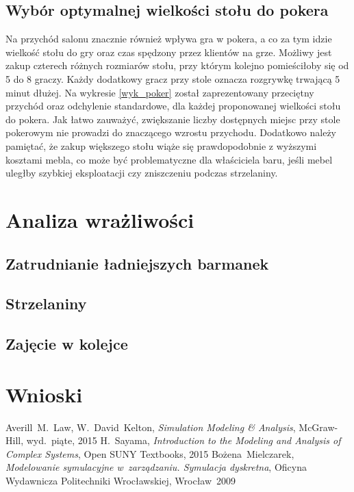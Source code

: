 \documentclass[12pt, a4paper, oneside]{mwart} %
\begin{document}
\subsection{Wybór optymalnej wielkości stołu do pokera}
Na przychód salonu znacznie również wpływa gra w pokera, a co za tym idzie wielkość stołu do gry oraz czas spędzony przez klientów na grze. Możliwy jest zakup czterech różnych rozmiarów stołu, przy którym kolejno pomieściłoby się od 5 do 8 graczy. Każdy dodatkowy gracz przy stole oznacza rozgrywkę trwającą 5 minut dłużej. Na wykresie \ref{wyk_poker} został zaprezentowany przeciętny przychód oraz odchylenie standardowe, dla każdej proponowanej wielkości stołu do pokera. Jak łatwo zauważyć, zwiększanie liczby dostępnych miejsc przy stole pokerowym nie prowadzi do znaczącego wzrostu przychodu. Dodatkowo należy pamiętać, że zakup większego stołu wiąże się prawdopodobnie z wyższymi kosztami mebla, co może być problematyczne dla właściciela baru, jeśli mebel uległby szybkiej eksploatacji czy zniszczeniu podczas strzelaniny.


\section{Analiza wrażliwości}

\subsection{Zatrudnianie ładniejszych barmanek}

\subsection{Strzelaniny}

\subsection{Zajęcie w kolejce}


\section{Wnioski}

\begin{thebibliography}{9}
Averill~M.~Law, W.~David~Kelton,
\emph{Simulation Modeling \& Analysis},
McGraw-Hill, wyd.~piąte, 2015
H.~Sayama, \emph{Introduction to the Modeling and Analysis of Complex Systems},
Open SUNY Textbooks, 2015
Bożena~Mielczarek, \emph{Modelowanie symulacyjne w~zarządzaniu. Symulacja dyskretna},
Oficyna Wydawnicza Politechniki Wrocławskiej, Wrocław~2009
\end{thebibliography}
\end{document}
